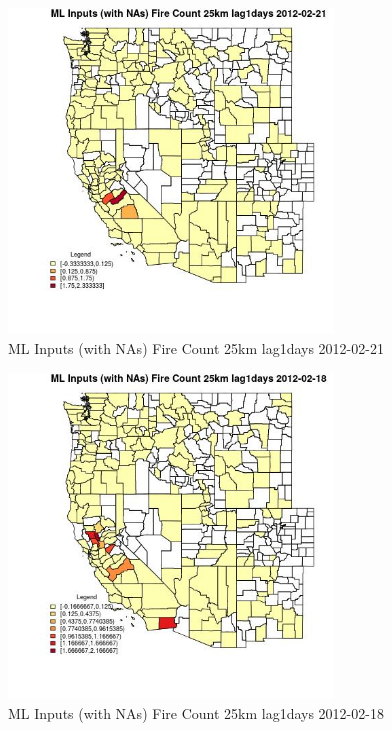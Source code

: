 \begin{figure} 
\centering  
\includegraphics[width=0.77\textwidth]{Code_Outputs/Report_ML_input_PM25_Step4_part_f_de_duplicated_aveswNAs_CountyFire_Count_25km_lag1daysMean2012-02-21.jpg} 
\caption{\label{fig:Report_ML_input_PM25_Step4_part_f_de_duplicated_aveswNAsCountyFire_Count_25km_lag1daysMean2012-02-21}ML Inputs (with NAs) Fire Count 25km lag1days 2012-02-21} 
\end{figure} 
 

\begin{figure} 
\centering  
\includegraphics[width=0.77\textwidth]{Code_Outputs/Report_ML_input_PM25_Step4_part_f_de_duplicated_aveswNAs_CountyFire_Count_25km_lag1daysMean2012-02-18.jpg} 
\caption{\label{fig:Report_ML_input_PM25_Step4_part_f_de_duplicated_aveswNAsCountyFire_Count_25km_lag1daysMean2012-02-18}ML Inputs (with NAs) Fire Count 25km lag1days 2012-02-18} 
\end{figure} 
 

